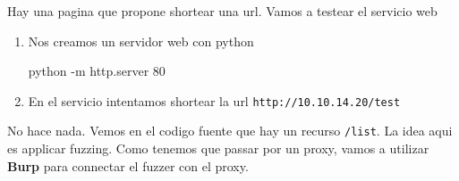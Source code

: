 \documentclass{assets/ipesethesis}
\newenvironment{Shaded}{\begin{snugshade}}{\end{snugshade}}
\newcommand{\ExtensionTok}[1]{#1}
\newcommand{\NormalTok}[1]{#1}
\begin{document}
Hay una pagina que propone shortear una url. Vamos a testear el servicio web

\begin{enumerate}
\def\labelenumi{\arabic{enumi}.}
\item
  Nos creamos un servidor web con python

\begin{Shaded}
\begin{Highlighting}[]
\ExtensionTok{python}\NormalTok{ -m http.server 80}
\end{Highlighting}
\end{Shaded}
\item
  En el servicio intentamos shortear la url \texttt{http://10.10.14.20/test}
\end{enumerate}

No hace nada. Vemos en el codigo fuente que hay un recurso \texttt{/list}. La idea aqui es applicar fuzzing. Como tenemos que passar
por un proxy, vamos a utilizar \textbf{Burp} para connectar el fuzzer con el proxy.
\end{document}
